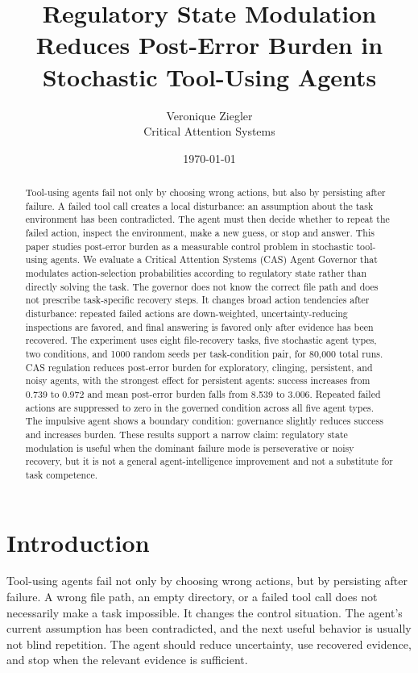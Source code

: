 \documentclass[11pt]{article}
\title{Regulatory State Modulation Reduces Post-Error Burden in Stochastic Tool-Using Agents}
\author{Veronique Ziegler\\Critical Attention Systems}
\date{\today}
\begin{document}
\maketitle

\begin{abstract}
Tool-using agents fail not only by choosing wrong actions, but also by persisting after failure. A failed tool call creates a local disturbance: an assumption about the task environment has been contradicted. The agent must then decide whether to repeat the failed action, inspect the environment, make a new guess, or stop and answer. This paper studies post-error burden as a measurable control problem in stochastic tool-using agents. We evaluate a Critical Attention Systems (CAS) Agent Governor that modulates action-selection probabilities according to regulatory state rather than directly solving the task. The governor does not know the correct file path and does not prescribe task-specific recovery steps. It changes broad action tendencies after disturbance: repeated failed actions are down-weighted, uncertainty-reducing inspections are favored, and final answering is favored only after evidence has been recovered. The experiment uses eight file-recovery tasks, five stochastic agent types, two conditions, and 1000 random seeds per task-condition pair, for 80,000 total runs. CAS regulation reduces post-error burden for exploratory, clinging, persistent, and noisy agents, with the strongest effect for persistent agents: success increases from 0.739 to 0.972 and mean post-error burden falls from 8.539 to 3.006. Repeated failed actions are suppressed to zero in the governed condition across all five agent types. The impulsive agent shows a boundary condition: governance slightly reduces success and increases burden. These results support a narrow claim: regulatory state modulation is useful when the dominant failure mode is perseverative or noisy recovery, but it is not a general agent-intelligence improvement and not a substitute for task competence.
\end{abstract}

\section{Introduction}

Tool-using agents fail not only by choosing wrong actions, but by persisting after failure. A wrong file path, an empty directory, or a failed tool call does not necessarily make a task impossible. It changes the control situation. The agent's current assumption has been contradicted, and the next useful behavior is usually not blind repetition. The agent should reduce uncertainty, use recovered evidence, and stop when the relevant evidence is sufficient.
\end{document}
